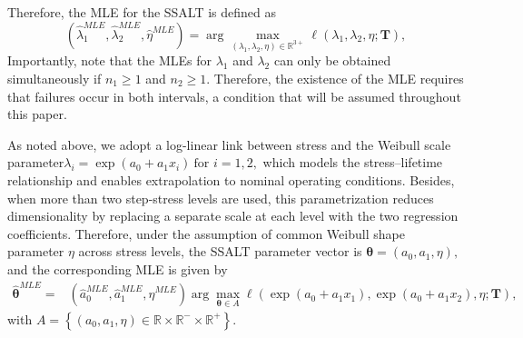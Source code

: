 \documentclass{article}
\begin{document}
Therefore, the MLE for the SSALT is defined as
\begin{equation*}
	\left(\hat{\lambda}_1^{MLE}, \hat{\lambda}_2^{MLE},\hat{\eta}^{MLE} \right) = \arg \max_{(\lambda_1, \lambda_2,\eta) \in \mathbb{R}^{3+}} \ell(\lambda_1, \lambda_2,\eta ; \bm{T}),
	\label{eq:max_likelihood_lambda}
\end{equation*}
Importantly, note that the MLEs for $ \lambda_1 $ and $ \lambda_2 $ can only be obtained simultaneously if $ n_1 \geq 1 $ and $ n_2 \geq 1 $. Therefore, the existence of the MLE requires that failures occur in both intervals, a condition that will be assumed throughout this paper.

As noted above, we adopt a log-linear link between stress and the Weibull scale parameter$\lambda_i = \exp(a_0 + a_1 x_i)\ \text{for } i=1, 2,$ 
which models the stress–lifetime relationship and enables extrapolation to nominal operating conditions. Besides, when more than two step-stress levels are used, this parametrization reduces dimensionality by replacing a separate scale at each level with the two regression coefficients. Therefore, under the assumption of common Weibull shape parameter $\eta$ across stress levels, the SSALT parameter vector is $\boldsymbol{\theta} = (a_0,a_1,\eta),$ and the corresponding MLE is given by
\begin{align}
	\boldsymbol{\widehat{\theta}}^{MLE} =& \left(\hat{a}_0^{MLE}, \hat{a}_1^{MLE},\hat{\eta}^{MLE} \right)  \arg \max_{\bm{\theta} \in A} \ell(\exp(a_0 + a_1 x_1), \exp(a_0 + a_1 x_2),\eta ; \bm{T}), \nonumber
	\label{eq:max_likelihood_params}
\end{align}
with
$A=\left\{ (a_0, a_1,\eta) \in \mathbb{R} \times  \mathbb{R}^{-} \times  \mathbb{R}^{+} \right\}$. 

\end{document}
